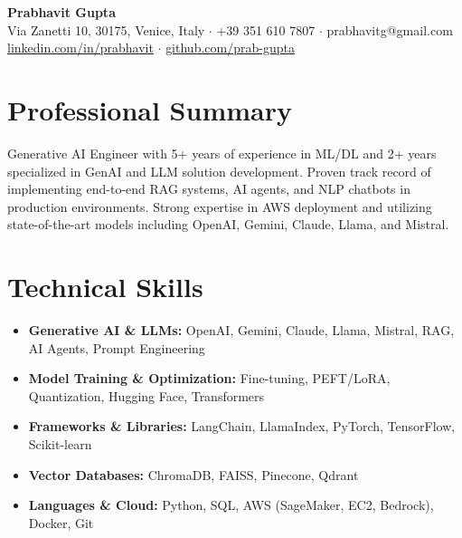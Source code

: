 \documentclass[10pt,a4paper]{article}
\begin{document}
\pagestyle{empty}

\begin{center}
    {\LARGE \textbf{Prabhavit Gupta}} \\
    \vspace{2mm}
    Via Zanetti 10, 30175, Venice, Italy $\cdot$ +39 351 610 7807 $\cdot$ prabhavitg@gmail.com \\
    \href{https://www.linkedin.com/in/prabhavit/}{linkedin.com/in/prabhavit} $\cdot$ \href{https://github.com/prab-gupta}{github.com/prab-gupta}
\end{center}

\section*{Professional Summary}
Generative AI Engineer with 5+ years of experience in ML/DL and 2+ years specialized in GenAI and LLM solution development. Proven track record of implementing end-to-end RAG systems, AI agents, and NLP chatbots in production environments. Strong expertise in AWS deployment and utilizing state-of-the-art models including OpenAI, Gemini, Claude, Llama, and Mistral.

\section*{Technical Skills}
\begin{itemize}[leftmargin=*,noitemsep]
    \item \textbf{Generative AI \& LLMs:} OpenAI, Gemini, Claude, Llama, Mistral, RAG, AI Agents, Prompt Engineering
    \item \textbf{Model Training \& Optimization:} Fine-tuning, PEFT/LoRA, Quantization, Hugging Face, Transformers
    \item \textbf{Frameworks \& Libraries:} LangChain, LlamaIndex, PyTorch, TensorFlow, Scikit-learn
    \item \textbf{Vector Databases:} ChromaDB, FAISS, Pinecone, Qdrant
    \item \textbf{Languages \& Cloud:} Python, SQL, AWS (SageMaker, EC2, Bedrock), Docker, Git
\end{itemize}
\end{document}
